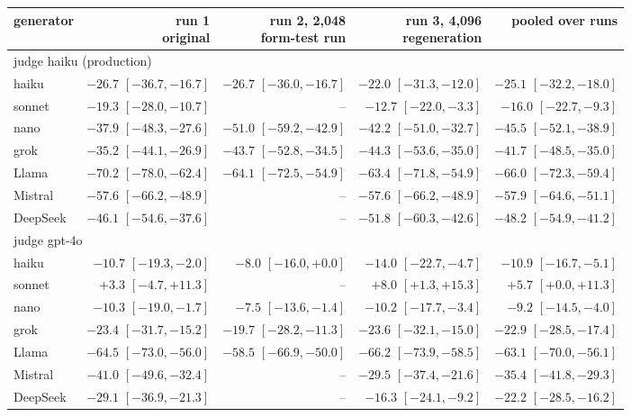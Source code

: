 \begin{tabular}{lrrrr}
\toprule
generator & \shortstack[r]{run 1\\original} & \shortstack[r]{run 2, 2,048\\form-test run} & \shortstack[r]{run 3, 4,096\\regeneration} & pooled over runs \\
\midrule
\multicolumn{5}{l}{judge haiku (production)} \\
haiku & $-26.7$ $[-36.7, -16.7]$ & $-26.7$ $[-36.0, -16.7]$ & $-22.0$ $[-31.3, -12.0]$ & $-25.1$ $[-32.2, -18.0]$ \\
sonnet & $-19.3$ $[-28.0, -10.7]$ & -- & $-12.7$ $[-22.0, -3.3]$ & $-16.0$ $[-22.7, -9.3]$ \\
nano & $-37.9$ $[-48.3, -27.6]$ & $-51.0$ $[-59.2, -42.9]$ & $-42.2$ $[-51.0, -32.7]$ & $-45.5$ $[-52.1, -38.9]$ \\
grok & $-35.2$ $[-44.1, -26.9]$ & $-43.7$ $[-52.8, -34.5]$ & $-44.3$ $[-53.6, -35.0]$ & $-41.7$ $[-48.5, -35.0]$ \\
Llama & $-70.2$ $[-78.0, -62.4]$ & $-64.1$ $[-72.5, -54.9]$ & $-63.4$ $[-71.8, -54.9]$ & $-66.0$ $[-72.3, -59.4]$ \\
Mistral & $-57.6$ $[-66.2, -48.9]$ & -- & $-57.6$ $[-66.2, -48.9]$ & $-57.9$ $[-64.6, -51.1]$ \\
DeepSeek & $-46.1$ $[-54.6, -37.6]$ & -- & $-51.8$ $[-60.3, -42.6]$ & $-48.2$ $[-54.9, -41.2]$ \\
\midrule
\multicolumn{5}{l}{judge gpt-4o} \\
haiku & $-10.7$ $[-19.3, -2.0]$ & $-8.0$ $[-16.0, +0.0]$ & $-14.0$ $[-22.7, -4.7]$ & $-10.9$ $[-16.7, -5.1]$ \\
sonnet & $+3.3$ $[-4.7, +11.3]$ & -- & $+8.0$ $[+1.3, +15.3]$ & $+5.7$ $[+0.0, +11.3]$ \\
nano & $-10.3$ $[-19.0, -1.7]$ & $-7.5$ $[-13.6, -1.4]$ & $-10.2$ $[-17.7, -3.4]$ & $-9.2$ $[-14.5, -4.0]$ \\
grok & $-23.4$ $[-31.7, -15.2]$ & $-19.7$ $[-28.2, -11.3]$ & $-23.6$ $[-32.1, -15.0]$ & $-22.9$ $[-28.5, -17.4]$ \\
Llama & $-64.5$ $[-73.0, -56.0]$ & $-58.5$ $[-66.9, -50.0]$ & $-66.2$ $[-73.9, -58.5]$ & $-63.1$ $[-70.0, -56.1]$ \\
Mistral & $-41.0$ $[-49.6, -32.4]$ & -- & $-29.5$ $[-37.4, -21.6]$ & $-35.4$ $[-41.8, -29.3]$ \\
DeepSeek & $-29.1$ $[-36.9, -21.3]$ & -- & $-16.3$ $[-24.1, -9.2]$ & $-22.2$ $[-28.5, -16.2]$ \\

\end{tabular}
